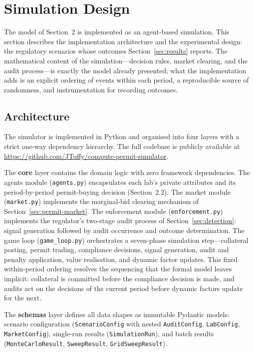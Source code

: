 \section{Simulation Design}

The model of Section~2 is implemented as an agent-based simulation. This section describes the implementation architecture and the experimental design: the regulatory scenarios whose outcomes Section~\ref{sec:results} reports. The mathematical content of the simulation---decision rules, market clearing, and the audit process---is exactly the model already presented; what the implementation adds is an explicit ordering of events within each period, a reproducible source of randomness, and instrumentation for recording outcomes.

\subsection{Architecture}

The simulator is implemented in Python and organised into four layers with a strict one-way dependency hierarchy. The full codebase is publicly available at
\url{https://github.com/JTuffy/compute-permit-simulator}.

The \textbf{core} layer contains the domain logic with zero framework dependencies. The agents module (\texttt{agents.py}) encapsulates each lab's private attributes and its period-by-period permit-buying decision (Section~2.2). The market module (\texttt{market.py}) implements the marginal-bid clearing mechanism of Section~\ref{sec:permit-market}. The enforcement module (\texttt{enforcement.py}) implements the regulator's two-stage audit process of Section~\ref{sec:detection}: signal generation followed by audit occurrence and outcome determination. The game loop (\texttt{game\_loop.py}) orchestrates a seven-phase simulation step---collateral posting, permit trading, compliance decisions, signal generation, audit and penalty application, value realisation, and dynamic factor updates. This fixed within-period ordering resolves the sequencing that the formal model leaves implicit: collateral is committed before the compliance decision is made, and audits act on the decisions of the current period before dynamic factors update for the next.

The \textbf{schemas} layer defines all data shapes as immutable Pydantic models: scenario configuration (\texttt{ScenarioConfig} with nested \texttt{AuditConfig}, \texttt{LabConfig}, \texttt{MarketConfig}), single-run results (\texttt{SimulationRun}), and batch results (\texttt{MonteCarloResult}, \texttt{SweepResult}, \texttt{GridSweepResult}).

